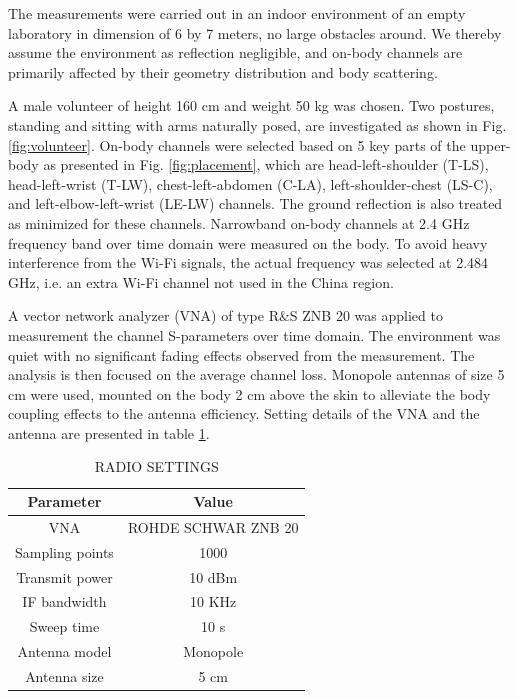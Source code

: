 \documentclass[conference]{IEEEtran}
\begin{document}
The measurements were carried out in an indoor environment of an empty laboratory in dimension of 6 by 7 meters, no large obstacles around. We thereby assume the environment as reflection negligible, and on-body channels are primarily affected by their geometry distribution and body scattering.

A male volunteer of height 160 cm and weight 50 kg was chosen. Two postures, standing and sitting with arms naturally posed, are investigated as shown in Fig. \ref{fig:volunteer}. On-body channels were selected based on 5 key parts of the upper-body as presented in Fig. \ref{fig:placement}, which are head-left-shoulder (T-LS), head-left-wrist (T-LW), chest-left-abdomen (C-LA), left-shoulder-chest (LS-C), and left-elbow-left-wrist (LE-LW) channels. The ground reflection is also treated as minimized for these channels. Narrowband on-body channels at 2.4 GHz frequency band over time domain were measured on the body. To avoid heavy interference from the Wi-Fi signals, the actual frequency was selected at 2.484 GHz, i.e. an extra Wi-Fi channel not used in the China region.

A vector network analyzer (VNA) of type R\&S ZNB 20 was applied to measurement the channel S-parameters over time domain. The environment was quiet with no significant fading effects observed from the measurement. The analysis is then focused on the average channel loss. Monopole antennas of size 5 cm were used, mounted on the body 2 cm above the skin to alleviate the body coupling effects to the antenna efficiency. Setting details of the VNA and the antenna are presented in table \ref{tab:1}.

\begin{table}[!t]
\centering
\captionsetup{labelsep=newline}
\caption{RADIO SETTINGS}
\label{tab:1}
\begin{tabular}{cc}
\hline
Parameter&Value\\
\hline
VNA&ROHDE SCHWAR ZNB 20\\
Sampling points&1000\\
Transmit power&10 dBm\\
IF bandwidth&10 KHz\\
Sweep time&10 s\\
\hline
Antenna model&Monopole\\
Antenna size&5 cm\\
\hline
\end{tabular}
\end{table}
\end{document}
